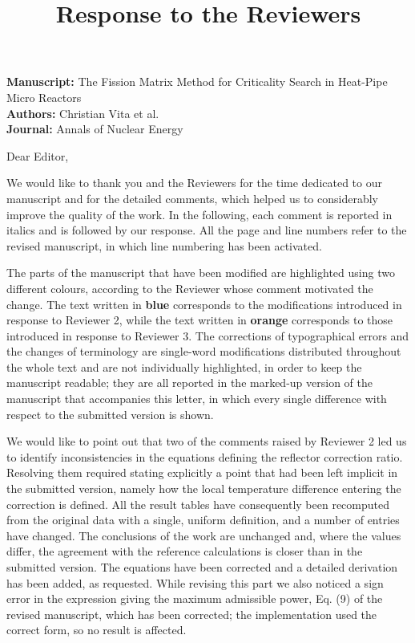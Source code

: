 \documentclass[11pt]{article}
\title{Response to the Reviewers}
\author{}
\date{}
\begin{document}
\noindent
\textbf{Manuscript:} The Fission Matrix Method for Criticality Search in Heat-Pipe Micro Reactors\\
\textbf{Authors:} Christian Vita et al.\\
\textbf{Journal:} Annals of Nuclear Energy

\bigskip

\noindent
Dear Editor,

We would like to thank you and the Reviewers for the time dedicated to our manuscript and for the detailed comments, which helped us to considerably improve the quality of the work. In the following, each comment is reported in italics and is followed by our response. All the page and line numbers refer to the revised manuscript, in which line numbering has been activated.

The parts of the manuscript that have been modified are highlighted using two different colours, according to the Reviewer whose comment motivated the change. The text written in \textcolor{revtwo}{\textbf{blue}} corresponds to the modifications introduced in response to Reviewer 2, while the text written in \textcolor{revthree}{\textbf{orange}} corresponds to those introduced in response to Reviewer 3. The corrections of typographical errors and the changes of terminology are single-word modifications distributed throughout the whole text and are not individually highlighted, in order to keep the manuscript readable; they are all reported in the marked-up version of the manuscript that accompanies this letter, in which every single difference with respect to the submitted version is shown.

We would like to point out that two of the comments raised by Reviewer 2 led us to identify inconsistencies in the equations defining the reflector correction ratio. Resolving them required stating explicitly a point that had been left implicit in the submitted version, namely how the local temperature difference entering the correction is defined. All the result tables have consequently been recomputed from the original data with a single, uniform definition, and a number of entries have changed. The conclusions of the work are unchanged and, where the values differ, the agreement with the reference calculations is closer than in the submitted version. The equations have been corrected and a detailed derivation has been added, as requested. While revising this part we also noticed a sign error in the expression giving the maximum admissible power, Eq. (9) of the revised manuscript, which has been corrected; the implementation used the correct form, so no result is affected.
\end{document}
